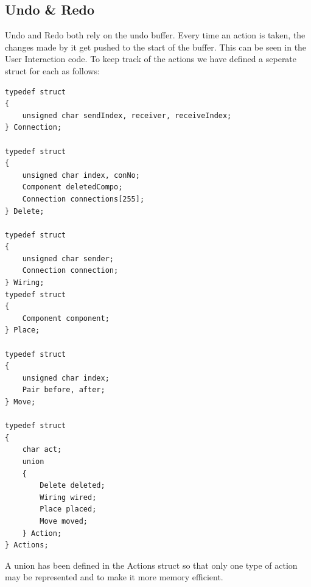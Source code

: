 \documentclass[report]{subfiles}
\begin{document}
\subsection{Undo \& Redo}
Undo and Redo both rely on the undo buffer. Every time an action is taken, the changes made by it get pushed to the start of the buffer. This can be seen in the User Interaction code.
To keep track of the actions we have defined a seperate struct for each as follows:
\begin{lstlisting}
typedef struct
{
    unsigned char sendIndex, receiver, receiveIndex;
} Connection;

typedef struct
{
    unsigned char index, conNo;
    Component deletedCompo;
    Connection connections[255];
} Delete;

typedef struct
{
    unsigned char sender;
    Connection connection;
} Wiring;
typedef struct
{
    Component component;
} Place;

typedef struct
{
    unsigned char index;
    Pair before, after;
} Move;

typedef struct
{
    char act;
    union
    {
        Delete deleted;
        Wiring wired;
        Place placed;
        Move moved;
    } Action;
} Actions;
\end{lstlisting}
A union has been defined in the Actions struct so that only one type of action may be represented and to make it more memory efficient.
\end{document}
